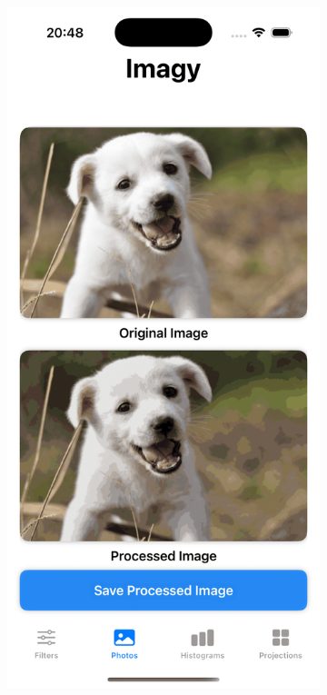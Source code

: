 \documentclass[a4paper]{article}
\begin{document}
\begin{figure}[H]
    \centering
    \begin{subfigure}{0.2\textwidth}
        \centering
        \includegraphics[width=\linewidth]{images/dog_posterize_10.png}

\end{subfigure}
\end{figure}
\end{document}
